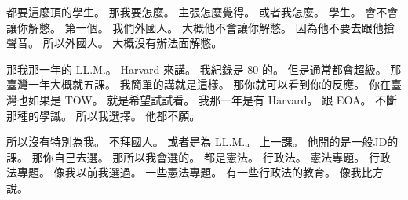 \hypertarget{c01:cue:2945}{}都要這麼頂的學生。
\hypertarget{c01:cue:2946}{}那我要怎麼。
\hypertarget{c01:cue:2947}{}主張怎麼覺得。
\hypertarget{c01:cue:2948}{}或者我怎麼。
\hypertarget{c01:cue:2949}{}學生。
\hypertarget{c01:cue:2950}{}會不會讓你解憋。
\hypertarget{c01:cue:2951}{}第一個。
\hypertarget{c01:cue:2952}{}我們外國人。
\hypertarget{c01:cue:2953}{}大概他不會讓你解憋。
\hypertarget{c01:cue:2954}{}因為他不要去跟他搶聲音。
\hypertarget{c01:cue:2955}{}所以外國人。
\hypertarget{c01:cue:2956}{}大概沒有辦法面解憋。

\hypertarget{c01:cue:2957}{}那我那一年的 LL.M.。
\hypertarget{c01:cue:2958}{}Harvard 來講。
\hypertarget{c01:cue:2959}{}我紀錄是 80 的。
\hypertarget{c01:cue:2960}{}但是通常都會超級。
\hypertarget{c01:cue:2961}{}那臺灣一年大概就五課。
\hypertarget{c01:cue:2962}{}我簡單的講就是這樣。
\hypertarget{c01:cue:2963}{}那你就可以看到你的反應。
\hypertarget{c01:cue:2964}{}你在臺灣也如果是 TOW。
\hypertarget{c01:cue:2965}{}就是希望試試看。
\hypertarget{c01:cue:2966}{}我那一年是有 Harvard。
\hypertarget{c01:cue:2967}{}跟 EOA。
\hypertarget{c01:cue:2968}{}不斷那種的學識。
\hypertarget{c01:cue:2969}{}所以我選擇。
\hypertarget{c01:cue:2970}{}他都不願。

\hypertarget{c01:cue:2971}{}所以沒有特別為我。
\hypertarget{c01:cue:2972}{}不拜國人。
\hypertarget{c01:cue:2973}{}或者是為 LL.M.。
\hypertarget{c01:cue:2974}{}上一課。
\hypertarget{c01:cue:2975}{}他開的是一般JD的課。
\hypertarget{c01:cue:2976}{}那你自己去選。
\hypertarget{c01:cue:2977}{}那所以我會選的。
\hypertarget{c01:cue:2978}{}都是憲法。
\hypertarget{c01:cue:2979}{}行政法。
\hypertarget{c01:cue:2980}{}憲法專題。
\hypertarget{c01:cue:2981}{}行政法專題。
\hypertarget{c01:cue:2982}{}像我以前我選過。
\hypertarget{c01:cue:2983}{}一些憲法專題。
\hypertarget{c01:cue:2984}{}有一些行政法的教育。
\hypertarget{c01:cue:2985}{}像我比方說。

